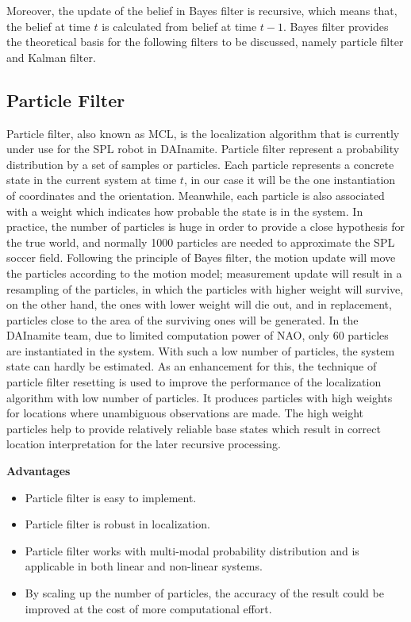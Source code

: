 Moreover, the update of the belief in Bayes filter is recursive, which means that, the belief at time $t$ is calculated from belief at time $t-1$.  Bayes filter provides the theoretical basis for the following filters to be discussed, namely particle filter and Kalman filter. 

\subsection{Particle Filter}
Particle filter, also known as \gls{MCL}, is the localization algorithm that is currently under use for the \gls{SPL} robot in DAInamite. Particle filter represent a probability distribution by a set of samples or particles. Each particle represents a concrete state in the current system at time $t$, in our case it will be the one instantiation of coordinates and the orientation. Meanwhile, each particle is also associated with a weight which indicates how probable the state is in the system. In practice, the number of particles is huge in order to provide a close hypothesis for the true world, and normally 1000 particles are needed to approximate the \gls{SPL} soccer field. Following the principle of Bayes filter, the motion update will move the particles according to the motion model; measurement update will result in a resampling of the particles, in which the particles with higher weight will survive, on the other hand, the ones with lower weight will die out, and in replacement, particles close to the area of the surviving ones will be generated. In the DAInamite team, due to limited computation power of NAO, only 60 particles are instantiated in the system. With such a low number of particles, the system state can hardly be estimated. As an enhancement for this, the technique of particle filter resetting is used to improve the performance of the localization algorithm with low number of particles. It produces particles with high weights for locations where unambiguous observations are made. The high weight particles help to provide relatively reliable base states which result in correct location interpretation for the later recursive processing. 

\noindent\textbf{Advantages}
\begin{itemize}
  \item  Particle filter is easy to implement.
  \item Particle filter is robust in localization. 
  \item  Particle filter works with multi-modal probability distribution and is applicable in both linear and non-linear systems.
  \item  By scaling up the number of particles, the accuracy of the result could be improved at the cost of more computational effort.
\end{itemize}


